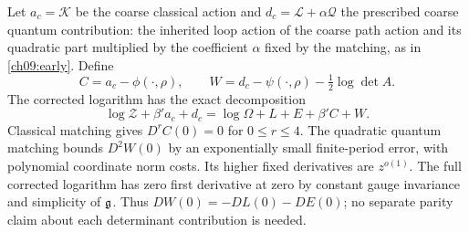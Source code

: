 Let $a_c=\mathcal K$ be the coarse classical action and
$d_c=\mathcal L+\alpha\mathcal Q$ the prescribed coarse quantum contribution:
the inherited loop action of the coarse path action and its quadratic part
multiplied by the coefficient $\alpha$ fixed by the matching, as in
\eqref{ch09:early}. Define
\[
 C=a_c-\phi(\cdot,\rho),\qquad
 W=d_c-\psi(\cdot,\rho)-\tfrac12\log\det A.
\]
The corrected logarithm has the exact decomposition
\begin{equation}
 \log\mathscr Z+\beta'a_c+d_c
                  =\log\Omega+L+E+\beta'C+W.
 \label{ch09:pure-decomposition}
\end{equation}
Classical matching gives $D^rC(0)=0$ for $0\le r\le4$.
The quadratic quantum matching bounds $D^2W(0)$ by an
exponentially small finite-period error, with polynomial coordinate
norm costs. Its higher fixed derivatives are $z^{o(1)}$.
The full corrected logarithm has zero first derivative at zero
by constant gauge invariance and simplicity of $\mathfrak g$.
Thus $DW(0)=-DL(0)-DE(0)$; no separate parity claim about each
determinant contribution is needed.

